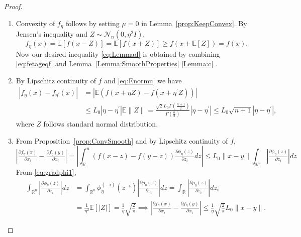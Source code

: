 \documentclass[11pt,reqno]{amsart}
\newcommand{\1}{{\bf 1}}
\newcommand{\2}{{\bf 2}}
\numberwithin{equation}{section}
\theoremstyle{remark}
\begin{document}
\begin{proof}
\begin{enumerate}[label =\alph*., wide, labelwidth=!, labelindent=0pt]
			\item Convexity of $f_\eta$ follows by setting $\mu=0$ in Lemma~\ref{prop:KeepConvex}. By Jensen's inequality and $Z \sim \mathcal{N}_n(0, \eta^2I)$,
			\begin{equation}\label{eq:fetageqf}
				f_\eta(x)=\mathbb{E}[f\left(x-Z\right)]=\mathbb{E}[f(x+Z)] \geq f(x+\mathbb{E}[Z])=f(x).
			\end{equation}
			Now our desired inequality \eqref{eq:Lemmad} is obtained by combining \eqref{eq:fetageqf} and Lemma~\ref{Lemma:SmoothProperties} \eqref{Lemma:c} .
			\item By Lipschitz continuity of $f$ and \eqref{eq:Enormu} we have
			\begin{align*}
				\left|f_{\eta}(x)-f_{\eta^{\prime}}(x)\right|&=\left|\mathbb{E}\left(f(x+\eta Z)-f(x+\eta^{\prime}Z)\right)\right|\\
				&\leq L_0\left|\eta-\eta^\prime\right|\mathbb{E}\|Z\|=\tfrac{\sqrt{2}L_0\Gamma(\tfrac{n+1}{2})}{\Gamma(\tfrac{n}{2})}|\eta-\eta^{\prime}|\leq L_0\sqrt{n+1}|\eta-\eta^{\prime}|,
			\end{align*}
			where $Z$ follows standard normal distribution.
			\item From Proposition~\ref{prop:ConvSmooth} and by Lipschitz continuity of $f$,
			\begin{equation}\label{eq:Lipparfeta}
				\left|\tfrac{\partial f_\eta(x)}{\partial x_i}-\tfrac{\partial f_\eta(y)}{\partial x_i}\right|=\left|\int_\mathbb{R}^n\left(f(x-z)-f(y-z)\right)\tfrac{\partial \phi_\eta(z)}{\partial z_i}dz\right|\le L_0 \|x-y\|\int_{\mathbb{R}^n}\left|\tfrac{\partial \phi_\eta(z)}{\partial z_i}\right|dz
			\end{equation}
			From \eqref{eq:gradphi1},
			\begin{align}\label{eq:intabsphieta}
				\quad \int_{\mathbb{R}^n}\left|\tfrac{\partial \phi_\eta(z)}{\partial z_i}\right|dz & = \int_{\mathbb{R}^n} \phi_{\eta}^{(-i)}(z^{-i}) \left|\tfrac{\partial \rho_\eta(z)}{\partial z_i}\right|  dz 
				= \int_{\mathbb{R}}  \left|\tfrac{\partial \rho_\eta(z)}{\partial z_i}\right|  dz_i \nonumber\\
				& = 
				\tfrac{1}{\eta^2}\mathbb{E}\left[|Z|\right]=\tfrac{1}{\eta}\sqrt{\tfrac{2}{\pi}}
				\implies %
				\left|\tfrac{\partial f_\eta(x)}{\partial x_i}-\tfrac{\partial f_\eta(y)}{\partial x_i}\right|
				\leq \tfrac{1}{\eta}\sqrt{\tfrac{2}{\pi}}{L_0 \|x-y\|}.

\end{align}
\end{enumerate}
\end{proof}
\end{document}
